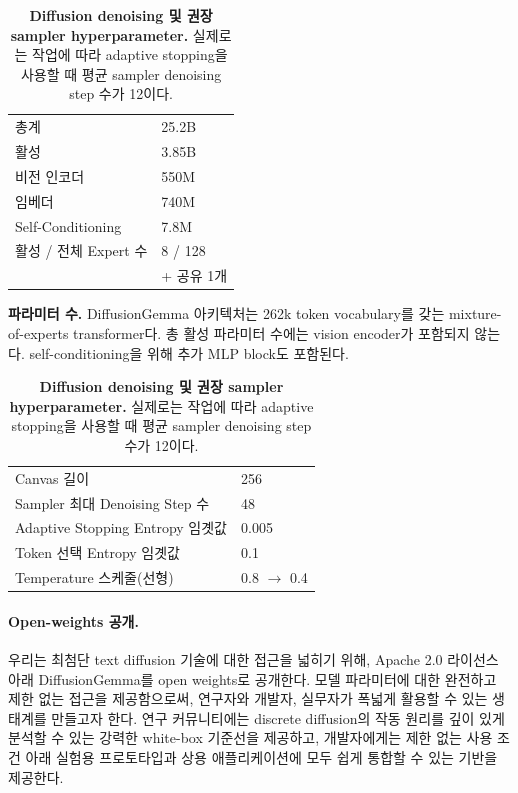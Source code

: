 \documentclass[11pt, a4paper, logo, copyright, gdm]{google}
\begin{document}
\begin{table}[t!]
\centering
\begin{minipage}[t]{0.43\textwidth}
\centering
\begin{tabular}[t]{ll}
\toprule
총계 & 25.2B \\
활성 & 3.85B \\
비전 인코더 & 550M \\
임베더 & 740M \\
Self-Conditioning & 7.8M \\
활성 / 전체 Expert 수 & 8 / 128 \\
 &  + 공유 1개 \\
\bottomrule
\end{tabular}
\caption{\textbf{파라미터 수.} DiffusionGemma 아키텍처는 262k token vocabulary를 갖는 mixture-of-experts transformer다. 총 활성 파라미터 수에는 vision encoder가 포함되지 않는다. self-conditioning을 위해 추가 MLP block도 포함된다.}
\label{tab:parameter-counts}
\end{minipage}\hfill
\begin{minipage}[t]{0.53\textwidth}
\centering
\begin{tabular}[t]{ll}
\toprule
Canvas 길이 & 256 \\
Sampler 최대 Denoising Step 수 & 48 \\
Adaptive Stopping Entropy 임곗값 & 0.005 \\
Token 선택 Entropy 임곗값 & 0.1 \\
Temperature 스케줄(선형) & 0.8 $\rightarrow$ 0.4 \\
\bottomrule
\end{tabular}
\caption{\textbf{Diffusion denoising 및 권장 sampler hyperparameter.} 실제로는 작업에 따라 adaptive stopping을 사용할 때 평균 sampler denoising step 수가 12이다.}
\label{tab:diffusion-hyperparams}
\end{minipage}
\end{table}

\paragraph{Open-weights 공개.} 우리는 최첨단 text diffusion 기술에 대한 접근을 넓히기 위해, Apache 2.0 라이선스 아래 DiffusionGemma를 open weights로 공개한다. 모델 파라미터에 대한 완전하고 제한 없는 접근을 제공함으로써, 연구자와 개발자, 실무자가 폭넓게 활용할 수 있는 생태계를 만들고자 한다. 연구 커뮤니티에는 discrete diffusion의 작동 원리를 깊이 있게 분석할 수 있는 강력한 white-box 기준선을 제공하고, 개발자에게는 제한 없는 사용 조건 아래 실험용 프로토타입과 상용 애플리케이션에 모두 쉽게 통합할 수 있는 기반을 제공한다.
\end{document}
